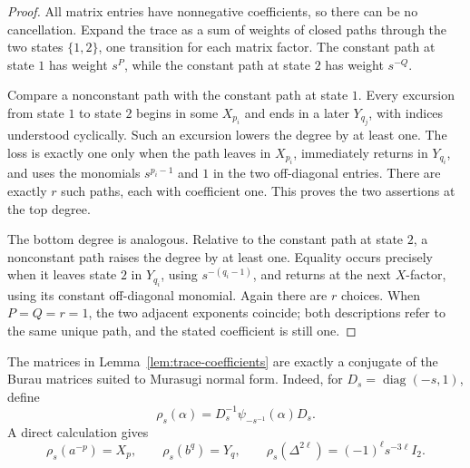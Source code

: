 \documentclass[10pt,a4paper]{amsart}
\begin{document}
\begin{proof}
All matrix entries have nonnegative coefficients, so there can be no cancellation.
Expand the trace as a sum of weights of closed paths through the two states
\(\{1,2\}\), one transition for each matrix factor.  The constant path at state
\(1\) has weight \(s^P\), while the constant path at state \(2\) has weight
\(s^{-Q}\).

Compare a nonconstant path with the constant path at state \(1\).  Every excursion
from state \(1\) to state \(2\) begins in some \(X_{p_i}\) and ends in a later
\(Y_{q_j}\), with indices understood cyclically.  Such an excursion lowers the
degree by at least one.  The loss is exactly one only when the path leaves in
\(X_{p_i}\), immediately returns in \(Y_{q_i}\), and uses the monomials
\(s^{p_i-1}\) and \(1\) in the two off-diagonal entries.  There are exactly \(r\)
such paths, each with coefficient one.  This proves the two assertions at the top
degree.

The bottom degree is analogous.  Relative to the constant path at state \(2\), a
nonconstant path raises the degree by at least one.  Equality occurs precisely when
it leaves state \(2\) in \(Y_{q_i}\), using \(s^{-(q_i-1)}\), and returns at the next
\(X\)-factor, using its constant off-diagonal monomial.  Again there are \(r\)
choices.  When \(P=Q=r=1\), the two adjacent exponents coincide; both descriptions
refer to the same unique path, and the stated coefficient is still one.
\end{proof}

The matrices in Lemma~\ref{lem:trace-coefficients} are exactly a conjugate of the
Burau matrices suited to Murasugi normal form.  Indeed, for
\(D_s=\operatorname{diag}(-s,1)\), define
\[
  \rho_s(\alpha)=D_s^{-1}\psi_{-s^{-1}}(\alpha)D_s.
\]
A direct calculation gives
\begin{equation}\label{eq:rho}
  \rho_s(a^{-p})=X_p,
  \qquad
  \rho_s(b^q)=Y_q,
  \qquad
  \rho_s(\Delta^{2\ell})=(-1)^\ell s^{-3\ell}I_2.
\end{equation}
\end{document}
